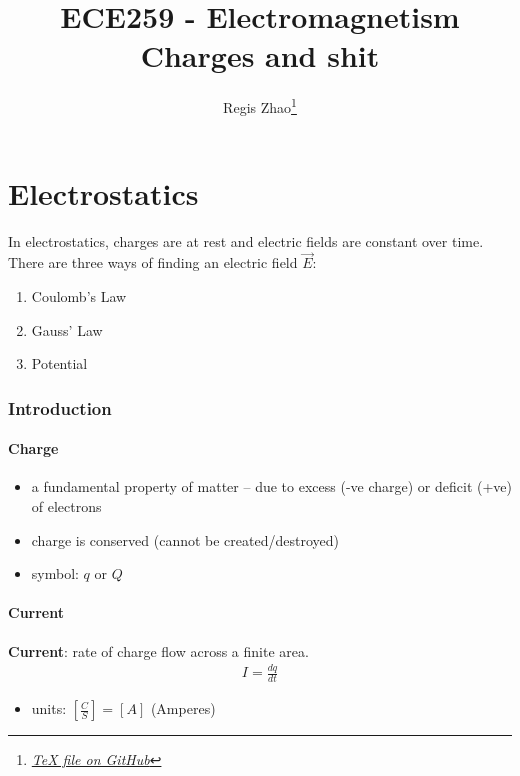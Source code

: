 \documentclass[10pt]{article}
\title{{\Huge ECE259 - Electromagnetism}\\{\Large{Charges and shit}}}
\author{Regis Zhao\footnote{\href{https://google.com/}{\textit{TeX file on GitHub}}}}
\affiliation{University of Toronto}
\begin{document}
\maketitle
\flushbottom
\newpage

\pagestyle{fancynotes}



\part{Electrostatics}
In electrostatics, charges are at rest and electric fields are constant over time. There are three ways of finding an electric field $\vec{E}$:
\begin{enumerate}
    \item Coulomb's Law
    \item Gauss' Law
    \item Potential
\end{enumerate}

\section{Introduction}
\subsection{Charge}
\begin{itemize}
    \item a fundamental property of matter -- due to excess (-ve charge) or deficit (+ve) of electrons 
    \item charge is conserved (cannot be created/destroyed) 
    \item symbol: $q$ or $Q$
\end{itemize}

\subsection{Current}
\begin{definition}
    \textbf{Current}: rate of charge flow across a finite area.
    \begin{align}
        I = \frac{dq}{dt}
    \end{align}
    \begin{itemize}
        \item units: $\left[\frac{C}{S}\right] = [A]$ (Amperes)
    \end{itemize}
\end{definition}
\end{document}
